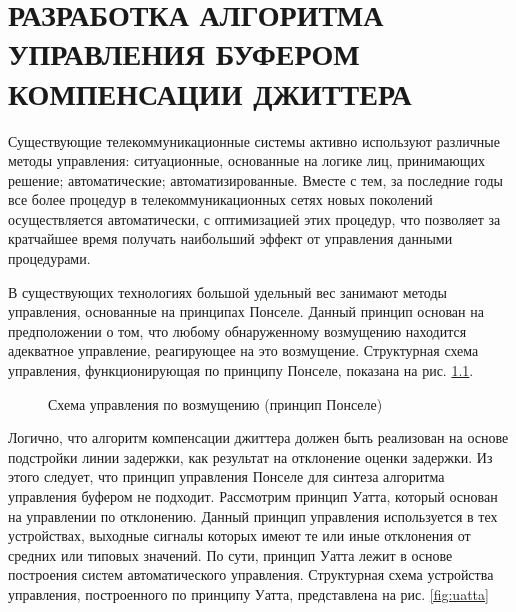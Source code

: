 \chapter{РАЗРАБОТКА АЛГОРИТМА УПРАВЛЕНИЯ БУФЕРОМ КОМПЕНСАЦИИ ДЖИТТЕРА} \label{chapt:man}

Существующие телекоммуникационные системы активно используют различные методы управления: ситуационные, основанные на логике лиц, принимающих решение; автоматические; автоматизированные.
Вместе с тем, за последние годы все более процедур в телекоммуникационных сетях новых поколений осуществляется автоматически, с оптимизацией этих процедур, что позволяет за кратчайшее время получать наибольший эффект от управления данными процедурами.

В существующих технологиях большой удельный вес занимают методы управления, основанные на принципах Понселе. Данный принцип основан на предположении о том, что любому обнаруженному возмущению находится адекватное управление, реагирующее на это возмущение.
Структурная схема управления, функционирующая по принципу Понселе, показана на рис. \ref{fig:ponsele}.


\begin{figure}[!h]

\centering
{} 
\caption{Схема управления по возмущению (принцип Понселе)}
\label{fig:ponsele}
\end{figure}

Логично, что алгоритм компенсации джиттера должен быть реализован на основе подстройки линии задержки, как результат на отклонение оценки задержки. 
Из этого следует, что принцип управления Понселе для синтеза алгоритма управления буфером не подходит. 
Рассмотрим принцип Уатта, который основан на управлении по отклонению.
Данный принцип управления используется в тех устройствах, выходные сигналы которых имеют те или иные отклонения от средних  или типовых значений.
По сути, принцип Уатта лежит в основе построения систем автоматического управления. Структурная схема устройства управления, построенного по принципу Уатта, представлена на рис. \ref{fig:uatta}


